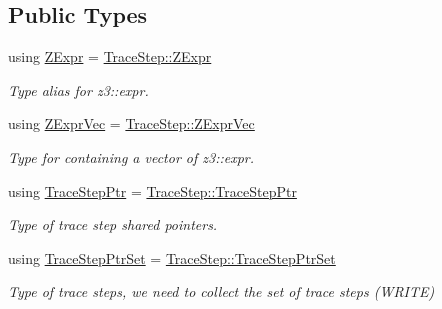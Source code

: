 \subsection*{Public Types}
\begin{DoxyCompactItemize}
\item 
\mbox{\label{classilang_1_1_memory_model_a9c7a763da08245af4a9465d261ed483a}} 
using \mbox{\hyperlink{classilang_1_1_memory_model_a9c7a763da08245af4a9465d261ed483a}{Z\+Expr}} = \mbox{\hyperlink{classilang_1_1_trace_step_a30c567f4df5a8481f8432b8c178a1794}{Trace\+Step\+::\+Z\+Expr}}
\begin{DoxyCompactList}\small\item\em Type alias for z3\+::expr. \end{DoxyCompactList}\item 
\mbox{\label{classilang_1_1_memory_model_ab0d3de967acef0330edf4d65d5782ce5}} 
using \mbox{\hyperlink{classilang_1_1_memory_model_ab0d3de967acef0330edf4d65d5782ce5}{Z\+Expr\+Vec}} = \mbox{\hyperlink{classilang_1_1_trace_step_a19a387426712dbec11dcecf170fb7e1a}{Trace\+Step\+::\+Z\+Expr\+Vec}}
\begin{DoxyCompactList}\small\item\em Type for containing a vector of z3\+::expr. \end{DoxyCompactList}\item 
\mbox{\label{classilang_1_1_memory_model_a0a752e8aa7fc6e84b6b6d4e596782860}} 
using \mbox{\hyperlink{classilang_1_1_memory_model_a0a752e8aa7fc6e84b6b6d4e596782860}{Trace\+Step\+Ptr}} = \mbox{\hyperlink{classilang_1_1_trace_step_a33d28af7bafbd3eadec8a957c63738ca}{Trace\+Step\+::\+Trace\+Step\+Ptr}}
\begin{DoxyCompactList}\small\item\em Type of trace step shared pointers. \end{DoxyCompactList}\item 
\mbox{\label{classilang_1_1_memory_model_adf275c2b36d17acd5b6e782c1eca7f92}} 
using \mbox{\hyperlink{classilang_1_1_memory_model_adf275c2b36d17acd5b6e782c1eca7f92}{Trace\+Step\+Ptr\+Set}} = \mbox{\hyperlink{classilang_1_1_trace_step_a83bd16e93305d10001282dbc5adb1583}{Trace\+Step\+::\+Trace\+Step\+Ptr\+Set}}
\begin{DoxyCompactList}\small\item\em Type of trace steps, we need to collect the set of trace steps (W\+R\+I\+TE) \end{DoxyCompactList}\item 

\end{DoxyCompactItemize}
